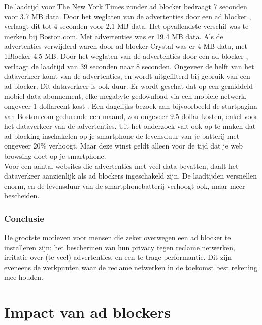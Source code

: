 \documentclass[pdftex,a4paper,12pt,twoside]{report}
\begin{document}
De laadtijd voor The New York Times zonder ad blocker bedraagt 7 seconden voor 3.7 MB data. Door het weglaten van de advertenties door een ad blocker , verlaagt dit tot 4 seconden voor 2.1 MB data. Het opvallendste verschil was te merken bij Boston.com. Met advertenties was er 19.4 MB data. Als de advertenties verwijderd waren door ad blocker Crystal was er 4 MB data, met 1Blocker 4.5 MB. Door het weglaten van de advertenties door een ad blocker , verlaagt de laadtijd van 39 seconden naar 8 seconden.
Ongeveer de helft van het dataverkeer komt van de advertenties, en wordt uitgefilterd bij gebruik van een ad blocker. Dit dataverkeer is ook duur. Er wordt geschat dat op een gemiddeld mobiel data-abonnement, elke megabyte gedownload via een mobiele netwerk, ongeveer 1 dollarcent kost . Een dagelijks bezoek aan bijvoorbeeld de startpagina van Boston.com gedurende een maand, zou ongeveer 9.5 dollar kosten, enkel voor het dataverkeer van de advertenties. 
Uit het onderzoek valt ook op te maken dat ad blocking inschakelen op je smartphone de levensduur van je batterij met ongeveer 20\% verhoogt. Maar deze winst geldt alleen voor de tijd dat je web browsing doet op je smartphone.
\\
Voor een aantal websites die advertenties met veel data bevatten, daalt het dataverkeer aanzienlijk als ad blockers ingeschakeld zijn. De laadtijden versnellen enorm, en de levensduur van de smartphonebatterij verhoogt ook, maar meer bescheiden.

\subsection{Conclusie}
\label{sec Conclusie}
De grootste motieven voor mensen die zeker overwegen een ad blocker te installeren zijn: het beschermen van hun privacy tegen reclame netwerken, irritatie over (te veel) advertenties, en een te trage performantie. Dit zijn eveneens de werkpunten waar de reclame netwerken in de toekomst best rekening mee houden. 

\chapter{Impact van ad blockers}
\label{ch: Impact van ad blockers}
\end{document}
